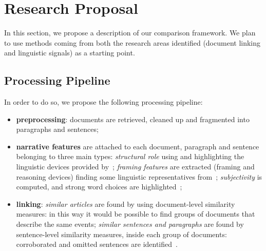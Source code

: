 \chapter{Research Proposal}
\label{chap:proposal}






In this section, we propose a description of our comparison framework.
We plan to use methods coming from both the research areas identified (document linking and linguistic signals) as a starting point.

\section{Processing Pipeline}


In order to do so, we propose the following processing pipeline:
\begin{itemize}
    \item \textbf{preprocessing}: documents are retrieved, cleaned up and fragmented into paragraphs and sentences;
    \item \textbf{narrative features} are attached to each document, paragraph and sentence belonging to three main types:
    \emph{structural role} using and highlighting the linguistic devices provided by~\cite{zahid2019towards};
    \emph{framing features} are extracted (framing and reasoning devices) finding some linguistic representatives from~\cite{gamson1989media,fillmore2006frame};
    \emph{subjectivity} is computed, and strong word choices are highlighted~\cite{liu2010sentiment};
    \item \textbf{linking}: \emph{similar articles} are found by using document-level similarity measures: in this way it would be possible to find groups of documents that describe the same events; \emph{similar sentences and paragraphs} are found by sentence-level similarity measures, inside each group of documents: corroborated and omitted sentences are identified~\cite{bountouridis2018explaining}.
\end{itemize}

